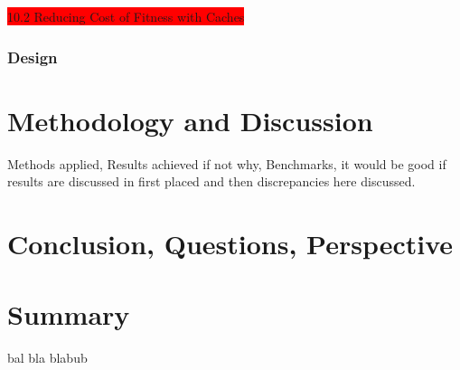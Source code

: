 \colorbox{red}{10.2 Reducing Cost of Fitness with Caches}

\label{ssub:analysis}

\subsubsection{Design} %
\label{ssub:design}


\section{Methodology and Discussion} %
\label{sec:appraisal_of_achievement}
Methods applied, Results achieved if not why, 
Benchmarks, it would be good if results are discussed in first placed
and then discrepancies here discussed.

\section{Conclusion, Questions, Perspective} %
\label{sec:conclusion_questions_perspective}




\section{Summary} %
\label{sec:summary}
bal bla blabub
